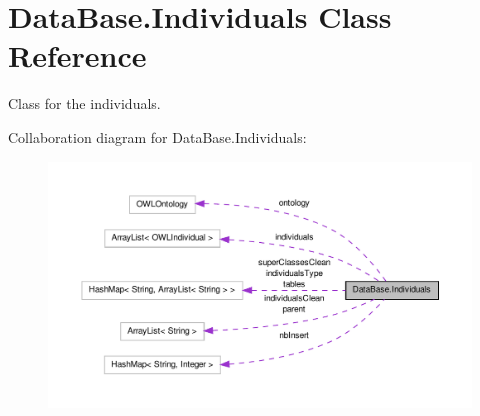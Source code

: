 \hypertarget{class_data_base_1_1_individuals}{
\section{DataBase.Individuals Class Reference}
\label{class_data_base_1_1_individuals}
}


Class for the individuals.  




Collaboration diagram for DataBase.Individuals:\nopagebreak
\begin{figure}[H]
\begin{center}
\leavevmode
\includegraphics[width=400pt]{class_data_base_1_1_individuals__coll__graph}
\end{center}
\end{figure}
